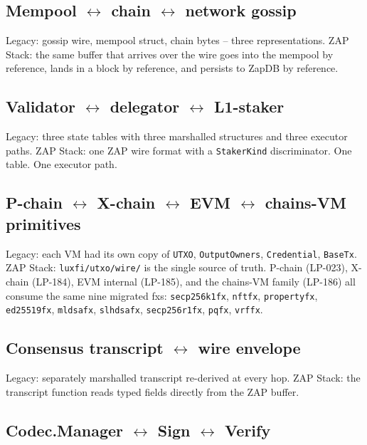 \subsection{Mempool $\leftrightarrow$ chain $\leftrightarrow$ network gossip}

Legacy: gossip wire, mempool struct, chain bytes -- three
representations.
ZAP Stack: the same buffer that arrives over the wire goes into the
mempool by reference, lands in a block by reference, and persists to
ZapDB by reference.

\subsection{Validator $\leftrightarrow$ delegator $\leftrightarrow$ L1-staker}

Legacy: three state tables with three marshalled structures and
three executor paths.
ZAP Stack: one ZAP wire format with a \texttt{StakerKind}
discriminator. One table. One executor path.

\subsection{P-chain $\leftrightarrow$ X-chain $\leftrightarrow$ EVM $\leftrightarrow$ chains-VM primitives}

Legacy: each VM had its own copy of \texttt{UTXO},
\texttt{OutputOwners}, \texttt{Credential}, \texttt{BaseTx}.
ZAP Stack: \texttt{luxfi/utxo/wire/} is the single source of truth.
P-chain (LP-023), X-chain (LP-184), EVM internal (LP-185), and the
chains-VM family (LP-186) all consume the same nine migrated fxs:
\texttt{secp256k1fx}, \texttt{nftfx}, \texttt{propertyfx},
\texttt{ed25519fx}, \texttt{mldsafx}, \texttt{slhdsafx},
\texttt{secp256r1fx}, \texttt{pqfx}, \texttt{vrffx}.

\subsection{Consensus transcript $\leftrightarrow$ wire envelope}

Legacy: separately marshalled transcript re-derived at every hop.
ZAP Stack: the transcript function reads typed fields directly from
the ZAP buffer.

\subsection{Codec.Manager $\leftrightarrow$ Sign $\leftrightarrow$ Verify}

